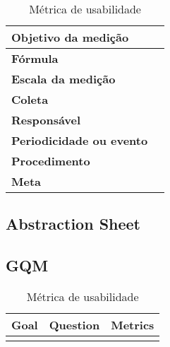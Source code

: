 \begin{table}[H]
\centering
\begin{tabular}{|p{4cm}|p{5cm}|}
\hline
	\textbf{Objetivo da medição} &

	\\ \hline
	\textbf{Fórmula} &

	\\ \hline
	\textbf{Escala da medição} &

	\\ \hline
	\textbf{Coleta} &

	\\ \hline
	\textbf{Responsável} &

	\\ \hline
	\textbf{Periodicidade ou evento} &

	\\ \hline
	\textbf{Procedimento} &

	\\ \hline
  \textbf{Meta} &

  \\ \hline
\end{tabular}
\caption{Métrica de usabilidade}
\label{tab:métrica_de_usabilidade}
\end{table}

\subsection{Abstraction Sheet}

\subsection{GQM}


\begin{table}[H]
\centering
\begin{tabular}{|c|c|c|}
\hline
	\textbf{Goal} &
  \textbf{Question} &
  \textbf{Metrics}
	\\ \hline
	 &
   &

	\\ \hline
\end{tabular}
\caption{Métrica de usabilidade}
\label{tab:métrica_de_usabilidade}
\end{table}


